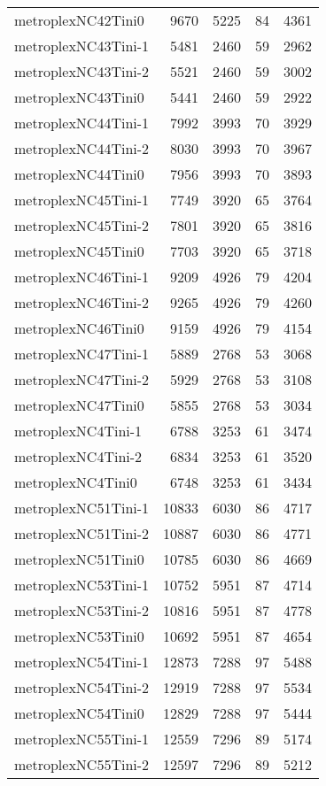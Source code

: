 \begin{longtable}{lrrrr}
metroplexNC42Tini0 & 9670 & 5225 & 84 & 4361 \\
metroplexNC43Tini-1 & 5481 & 2460 & 59 & 2962 \\
metroplexNC43Tini-2 & 5521 & 2460 & 59 & 3002 \\
metroplexNC43Tini0 & 5441 & 2460 & 59 & 2922 \\
metroplexNC44Tini-1 & 7992 & 3993 & 70 & 3929 \\
metroplexNC44Tini-2 & 8030 & 3993 & 70 & 3967 \\
metroplexNC44Tini0 & 7956 & 3993 & 70 & 3893 \\
metroplexNC45Tini-1 & 7749 & 3920 & 65 & 3764 \\
metroplexNC45Tini-2 & 7801 & 3920 & 65 & 3816 \\
metroplexNC45Tini0 & 7703 & 3920 & 65 & 3718 \\
metroplexNC46Tini-1 & 9209 & 4926 & 79 & 4204 \\
metroplexNC46Tini-2 & 9265 & 4926 & 79 & 4260 \\
metroplexNC46Tini0 & 9159 & 4926 & 79 & 4154 \\
metroplexNC47Tini-1 & 5889 & 2768 & 53 & 3068 \\
metroplexNC47Tini-2 & 5929 & 2768 & 53 & 3108 \\
metroplexNC47Tini0 & 5855 & 2768 & 53 & 3034 \\
metroplexNC4Tini-1 & 6788 & 3253 & 61 & 3474 \\
metroplexNC4Tini-2 & 6834 & 3253 & 61 & 3520 \\
metroplexNC4Tini0 & 6748 & 3253 & 61 & 3434 \\
metroplexNC51Tini-1 & 10833 & 6030 & 86 & 4717 \\
metroplexNC51Tini-2 & 10887 & 6030 & 86 & 4771 \\
metroplexNC51Tini0 & 10785 & 6030 & 86 & 4669 \\
metroplexNC53Tini-1 & 10752 & 5951 & 87 & 4714 \\
metroplexNC53Tini-2 & 10816 & 5951 & 87 & 4778 \\
metroplexNC53Tini0 & 10692 & 5951 & 87 & 4654 \\
metroplexNC54Tini-1 & 12873 & 7288 & 97 & 5488 \\
metroplexNC54Tini-2 & 12919 & 7288 & 97 & 5534 \\
metroplexNC54Tini0 & 12829 & 7288 & 97 & 5444 \\
metroplexNC55Tini-1 & 12559 & 7296 & 89 & 5174 \\
metroplexNC55Tini-2 & 12597 & 7296 & 89 & 5212 \\

\end{longtable}
